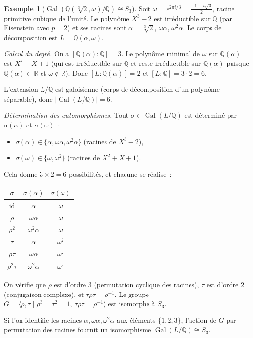 \documentclass[12pt,a4paper,openany]{book}
\theoremstyle{definition}
\newtheorem{exemple}{Exemple}[chapter]
\newcommand{\Q}{\mathbb{Q}}
\newcommand{\R}{\mathbb{R}}
\newcommand{\Gal}{\operatorname{Gal}}
\begin{document}
\begin{exemple}[{$\Gal(\Q(\sqrt[3]{2}, \omega)/\Q) \cong S_3$}]\label{ex:gal-cube-root-2}
\index{groupe!de Galois!de $\Q(\sqrt[3]{2},\omega)/\Q$}
Soit $\omega = e^{2\pi i/3} = \frac{-1+i\sqrt{3}}{2}$, racine primitive
cubique de l'unité. Le polynôme $X^3 - 2$ est irréductible sur $\Q$ (par
Eisenstein avec $p = 2$) et ses racines sont
$\alpha = \sqrt[3]{2}$, $\omega\alpha$, $\omega^2\alpha$.
Le corps de décomposition est $L = \Q(\alpha, \omega)$.

\emph{Calcul du degré.} On a $[\Q(\alpha):\Q] = 3$. Le polynôme minimal
de $\omega$ sur $\Q(\alpha)$ est $X^2 + X + 1$ (qui est irréductible sur
$\Q$ et reste irréductible sur $\Q(\alpha)$ puisque $\Q(\alpha) \subset \R$
et $\omega \notin \R$). Donc $[L:\Q(\alpha)] = 2$ et
$[L:\Q] = 3 \cdot 2 = 6$.

L'extension $L/\Q$ est galoisienne (corps de décomposition d'un polynôme
séparable), donc $|\Gal(L/\Q)| = 6$.

\emph{Détermination des automorphismes.} Tout $\sigma \in \Gal(L/\Q)$ est
déterminé par $\sigma(\alpha)$ et $\sigma(\omega)$~:
\begin{itemize}
  \item $\sigma(\alpha) \in \{\alpha, \omega\alpha, \omega^2\alpha\}$
    (racines de $X^3-2$),
  \item $\sigma(\omega) \in \{\omega, \omega^2\}$
    (racines de $X^2+X+1$).
\end{itemize}
Cela donne $3 \times 2 = 6$ possibilités, et chacune se réalise~:

\begin{center}
\renewcommand{\arraystretch}{1.2}
\begin{tabular}{c|cc}
  $\sigma$ & $\sigma(\alpha)$ & $\sigma(\omega)$ \\
  \hline
  $\mathrm{id}$ & $\alpha$ & $\omega$ \\
  $\rho$ & $\omega\alpha$ & $\omega$ \\
  $\rho^2$ & $\omega^2\alpha$ & $\omega$ \\
  $\tau$ & $\alpha$ & $\omega^2$ \\
  $\rho\tau$ & $\omega\alpha$ & $\omega^2$ \\
  $\rho^2\tau$ & $\omega^2\alpha$ & $\omega^2$
\end{tabular}
\end{center}
On vérifie que $\rho$ est d'ordre $3$ (permutation cyclique des racines),
$\tau$ est d'ordre $2$ (conjugaison complexe), et $\tau\rho\tau = \rho^{-1}$.
Le groupe $G = \langle \rho, \tau \mid \rho^3 = \tau^2 = 1,\
\tau\rho\tau = \rho^{-1}\rangle$ est isomorphe à $S_3$.

Si l'on identifie les racines $\alpha, \omega\alpha, \omega^2\alpha$ aux
éléments $\{1, 2, 3\}$, l'action de $G$ par permutation des racines fournit
un isomorphisme $\Gal(L/\Q) \cong S_3$.
\end{exemple}
\end{document}
